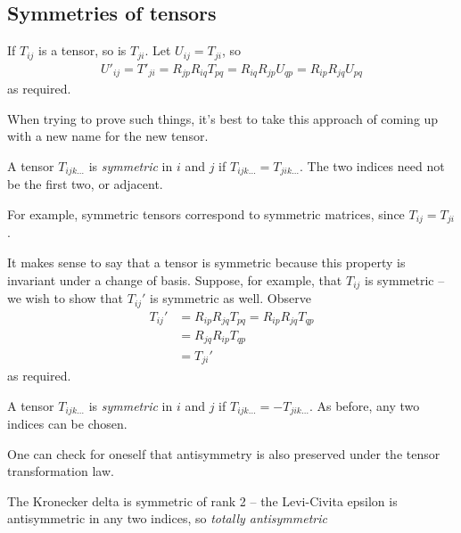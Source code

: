 \documentclass{../../template/note}
\begin{document}
    \subsection{Symmetries of tensors}

    If \(T_{ij}\) is a tensor, so is \(T_{ji}\). Let \(U_{ij} = T_{ji}\), so
    \begin{align*}
        U'_{ij} = T'_{ji} = R_{jp}R_{iq}T_{pq} = R_{iq}R_{jp}U_{qp} = R_{ip}R_{jq}U_{pq}
    \end{align*}
    as required.
    
    \begin{remark*}
        When trying to prove such things, it's best to take this approach of coming up with a new name for the new tensor.
    \end{remark*}
    
    \begin{definition*}
        A tensor \(T_{ijk\dots}\) is \emph{symmetric} in \(i\) and \(j\) if \(T_{ijk\dots} = T_{jik\dots}\). The two indices need not be the first two, or adjacent.
    \end{definition*}
    
    For example, symmetric tensors correspond to symmetric matrices, since \(T_{ij} = T_{ji}\).

    It makes sense to say that a tensor is symmetric because this property is invariant under a change of basis. Suppose, for example, that \(T_{ij}\) is symmetric -- we wish to show that \(T_{ij}'\) is symmetric as well. Observe
    \begin{align*}
        T_{ij}' &= R_{ip}R_{jq}T_{pq} = R_{ip}R_{jq}T_{qp} \\
        &= R_{jq}R_{ip}T_{qp} \\
        &= T_{ji}'
    \end{align*}
    as required.

    \begin{definition*}
        A tensor \(T_{ijk\dots}\) is \emph{symmetric} in \(i\) and \(j\) if \(T_{ijk\dots} = -T_{jik\dots}\). As before, any two indices can be chosen.
    \end{definition*}
    
    One can check for oneself that antisymmetry is also preserved under the tensor transformation law.

    \begin{example*}
        The Kronecker delta is symmetric of rank 2 -- the Levi-Civita epsilon is antisymmetric in any two indices, so \emph{totally antisymmetric}
    \end{example*}
    
\end{document}
